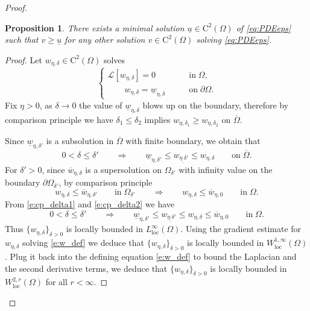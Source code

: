 \documentclass[11pt,reqno]{amsart}
\numberwithin{figure}{section}
\theoremstyle{plain}
\newtheorem{prop}[thm]{Proposition}
\theoremstyle{remark}
\numberwithin{equation}{section}
\begin{document}
\begin{proof}
\begin{prop}\label{pro:minimalsol} There exists a minimal solution $\underline{u}\in \mathrm{C}^2(\Omega)$ of \eqref{eq:PDEeps} such that $v\geq \underline{u}$ for any other solution $v\in \mathrm{C}^2(\Omega)$ solving \eqref{eq:PDEeps}.
\end{prop}
\begin{proof} Let $w_{\eta,\delta}\in \mathrm{C}^2(\Omega)$ solves
    \begin{equation}\label{e:w_def}
    \begin{cases}
        \mathcal{L}\left[w_{\eta,\delta}\right] = 0 &\qquad\text{in}\;\Omega,\\
        \qquad w_{\eta,\delta} = \underline{w}_{\eta,\delta} &\qquad\text{on}\;\partial\Omega.
    \end{cases}
    \end{equation}
    Fix $\eta>0$, as $\delta\to 0$ the value of $\underline{w}_{\eta,\delta}$ blows up on the boundary, therefore by comparison principle we have $\delta_1 \leq  \delta_2$ implies $w_{\eta,\delta_1}\geq  w_{\eta,\delta_2}$ on $\overline{\Omega}$. 

    
    \noindent Since $\underline{w}_{\eta,\delta'}$ is a subsolution in $\overline{\Omega}$ with finite boundary, we obtain that
    \begin{equation}\label{e:cp_delta1}
        0<\delta \leq \delta'\qquad\Longrightarrow\qquad \underline{w}_{\eta,\delta'} \leq w_{\eta_,\delta'}\leq w_{\eta,\delta} \qquad\text{on}\;\overline{\Omega}.
    \end{equation}
    For $\delta' > 0$, since $\overline{w}_{\eta,\delta}$ is a supersolution on $\Omega_{\delta'}$ with infinity value on the boundary $\partial\Omega_{\delta'}$, by comparison principle
    \begin{equation}\label{e:cp_delta2}
        w_{\eta,\delta} \leq \overline{w}_{\eta, \delta'} \qquad\text{in}\;\Omega_{\delta'} \qquad\Longrightarrow\qquad w_{\eta,\delta} \leq \overline{w}_{\eta,0} \qquad\text{in}\;\Omega.
    \end{equation}
    From \eqref{e:cp_delta1} and \eqref{e:cp_delta2} we have
    \begin{equation}\label{e:cp_delta3}
        0<\delta \leq \delta'\qquad\Longrightarrow\qquad \underline{w}_{\eta,\delta'} \leq w_{\eta_,\delta'}\leq w_{\eta,\delta} \leq \overline{w}_{\eta,0} \qquad\text{in}\;\Omega.
    \end{equation}
    Thus $\{w_{\eta,\delta}\}_{\delta>0}$ is locally bounded in $L^{\infty}_{\mathrm{loc}}(\Omega)$. Using the gradient estimate for $w_{\eta,\delta}$ solving \eqref{e:w_def} we deduce that $\{w_{\eta,\delta}\}_{\delta>0}$ is locally bounded in $W^{1,\infty}_{\mathrm{loc}}(\Omega)$. Plug it back into the defining equation \eqref{e:w_def} to bound the Laplacian and the second derivative terms, we deduce that $\{w_{\eta,\delta}\}_{\delta>0}$ is locally bounded in $W^{2,r}_{\mathrm{loc}}(\Omega)$ for all $r<\infty$.
    

\end{proof}
\end{proof}
\end{document}
